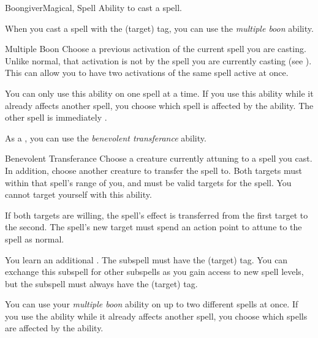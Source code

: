     \begin{feat}{Boongiver}{Magical, Spell}
        \featpre Ability to cast a spell.

         When you cast a spell with the  (target) tag, you can use the \textit{multiple boon} ability.
        \begin{ability}{Multiple Boon}
            Choose a previous activation of the current spell you are casting.
            Unlike normal, that activation is not  by the spell you are currently casting (see ).
            This can allow you to have two activations of the same spell active at once.

            You can only use this ability on one spell at a time.
            If you use this ability while it already affects another spell, you choose which spell is affected by the ability.
            The other spell is immediately .
        \end{ability}

         As a , you can use the \textit{benevolent transferance} ability.
        \begin{ability}{Benevolent Transferance}
            Choose a creature currently attuning to a spell you cast.
            In addition, choose another creature to transfer the spell to.
            Both targets must within that spell's range of you, and must be valid targets for the spell.
            You cannot target yourself with this ability.

            If both targets are willing, the spell's effect is transferred from the first target to the second.
            The spell's new target must spend an action point to attune to the spell as normal.
        \end{ability}

         You learn an additional .
        The subspell must have the  (target) tag.
        You can exchange this subspell for other subspells as you gain access to new spell levels, but the subspell must always have the  (target) tag.

         You can use your \textit{multiple boon} ability on up to two different spells at once.
        If you use the ability while it already affects another spell, you choose which spells are affected by the ability.


\end{feat}
